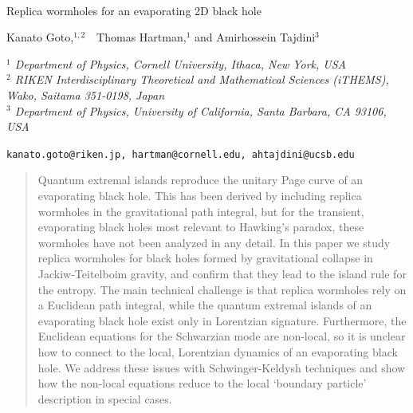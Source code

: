 \documentclass[11pt,oneside,letterpaper]{article}
\numberwithin{equation}{section}
\begin{document}
\begin{spacing}{1.1}
\begin{center}

~
\vskip1cm

{\LARGE {
Replica wormholes for an evaporating 2D black hole
\ \\
}}

\vskip10mm

Kanato Goto,$^{1,2}$\ \ Thomas Hartman,$^{1}$  and Amirhossein Tajdini$^{3}$

\vskip5mm

{\it $^1$ Department of Physics, Cornell University, Ithaca, New York, USA
}  \\ \bigskip
{\it $^2$ RIKEN Interdisciplinary Theoretical and Mathematical Sciences (iTHEMS),\\ 
Wako, Saitama 351-0198, Japan } \\  \bigskip
{\it $^3$ Department of Physics, University of California, Santa Barbara, CA 93106, USA
}
\vskip5mm

{\tt  kanato.goto@riken.jp, hartman@cornell.edu, ahtajdini@ucsb.edu}

\vskip5mm





\end{center}

\vspace{4mm}
\begin{abstract}
\noindent
 Quantum extremal islands reproduce the unitary Page curve of an evaporating black hole. 
This has been derived by including replica wormholes in the gravitational path integral, but for the transient, evaporating black holes most relevant to Hawking's paradox, these wormholes have not been analyzed in any detail. In this paper we study replica wormholes for black holes formed by gravitational collapse in Jackiw-Teitelboim gravity, and confirm that they lead to the island rule for the entropy. The main technical challenge is that replica wormholes rely on a Euclidean path integral, while the quantum extremal islands of an evaporating black hole exist only in Lorentzian signature. Furthermore, the Euclidean equations for the Schwarzian mode are non-local, so it is unclear how to connect to the local, Lorentzian dynamics of an evaporating black hole.
We address these issues with Schwinger-Keldysh techniques and show how the non-local equations reduce to the local `boundary particle' description in special cases.


 \end{abstract}


\pagebreak
\pagestyle{plain}

\setcounter{tocdepth}{2}
{}
\vfill

\end{spacing}
\end{document}

